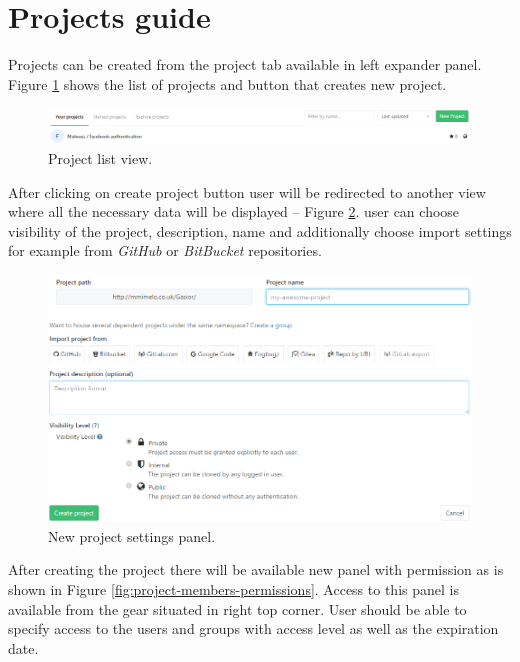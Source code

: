 \section{Projects guide} \label{s:platform-user-guide:projects}
	Projects can be created from the project tab available in left expander panel. Figure \ref{fig:project-list-view} shows the list of projects and button that creates new project.
	\begin{figure}[!htbp]
		\centering
		\includegraphics[width=1\textwidth]{img/ug-project/new-project2}
		\caption{Project list view.}
		\label{fig:project-list-view}
	\end{figure}
	After clicking on create project button user will be redirected to another view where all the necessary data will be displayed -- Figure \ref{fig:project-settings}. user can choose visibility of the project, description, name and additionally choose import settings for example from \emph{GitHub} or \emph{BitBucket} repositories. 
	\begin{figure}[!htbp]
		\centering
		\includegraphics[width=1\textwidth]{img/ug-project/new-project-settings}
		\caption{New project settings panel.}
		\label{fig:project-settings}
	\end{figure}
	After creating the project there will be available new panel with permission as is shown in Figure \ref{fig:project-members-permissions}. Access to this panel is available from the gear situated in right top corner. User should be able to specify access to the users and groups with access level as well as the expiration date.
